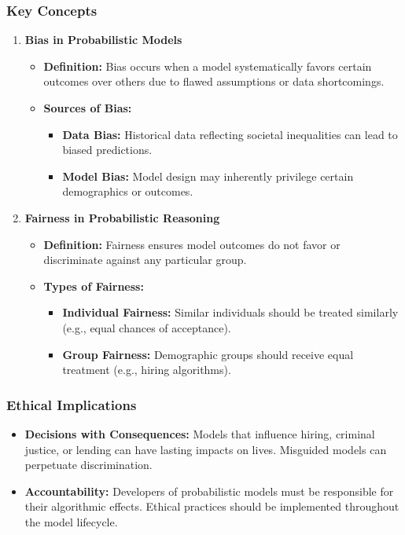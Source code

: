 \documentclass[aspectratio=169]{beamer}
\begin{document}
\begin{frame}[fragile]
    \frametitle{Key Concepts}
    
    \begin{enumerate}
        \item \textbf{Bias in Probabilistic Models}
        \begin{itemize}
            \item \textbf{Definition:} Bias occurs when a model systematically favors certain outcomes over others due to flawed assumptions or data shortcomings.
            \item \textbf{Sources of Bias:}
            \begin{itemize}
                \item \textbf{Data Bias:} Historical data reflecting societal inequalities can lead to biased predictions.
                \item \textbf{Model Bias:} Model design may inherently privilege certain demographics or outcomes.
            \end{itemize}
        \end{itemize}

        \item \textbf{Fairness in Probabilistic Reasoning}
        \begin{itemize}
            \item \textbf{Definition:} Fairness ensures model outcomes do not favor or discriminate against any particular group.
            \item \textbf{Types of Fairness:}
            \begin{itemize}
                \item \textbf{Individual Fairness:} Similar individuals should be treated similarly (e.g., equal chances of acceptance).
                \item \textbf{Group Fairness:} Demographic groups should receive equal treatment (e.g., hiring algorithms).
            \end{itemize}
        \end{itemize}
    \end{enumerate}
\end{frame}

\begin{frame}[fragile]
    \frametitle{Ethical Implications}
    
    \begin{itemize}
        \item \textbf{Decisions with Consequences:} Models that influence hiring, criminal justice, or lending can have lasting impacts on lives. Misguided models can perpetuate discrimination.
        \item \textbf{Accountability:} Developers of probabilistic models must be responsible for their algorithmic effects. Ethical practices should be implemented throughout the model lifecycle.
    \end{itemize}
\end{frame}
\end{document}
